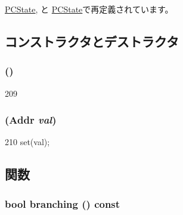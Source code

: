 \hyperlink{classNullISA_1_1PCState_aa6c21965de6773cbfc732c23d7263a9f}{PCState}, と \hyperlink{classX86ISA_1_1PCState_aa6c21965de6773cbfc732c23d7263a9f}{PCState}で再定義されています。

\subsection{コンストラクタとデストラクタ}
\hypertarget{classGenericISA_1_1UPCState_a617a27ae163e68a865b9935f62d5f821}{
\subsubsection[{UPCState}]{ ()}}
\label{classGenericISA_1_1UPCState_a617a27ae163e68a865b9935f62d5f821}



\begin{DoxyCode}
209 {}
\end{DoxyCode}
\hypertarget{classGenericISA_1_1UPCState_ad29f717a0f93dcfb3b6da3854c4bd22d}{
\subsubsection[{UPCState}]{ ({\bf Addr} {\em val})}}
\label{classGenericISA_1_1UPCState_ad29f717a0f93dcfb3b6da3854c4bd22d}



\begin{DoxyCode}
210 { set(val); }
\end{DoxyCode}


\subsection{関数}
\hypertarget{classGenericISA_1_1UPCState_ae3f0eb15a9382eefff6b00cf7999c2e3}{
\subsubsection[{branching}]{\setlength{\rightskip}{0pt plus 5cm}bool branching () const}}
\label{classGenericISA_1_1UPCState_ae3f0eb15a9382eefff6b00cf7999c2e3}


